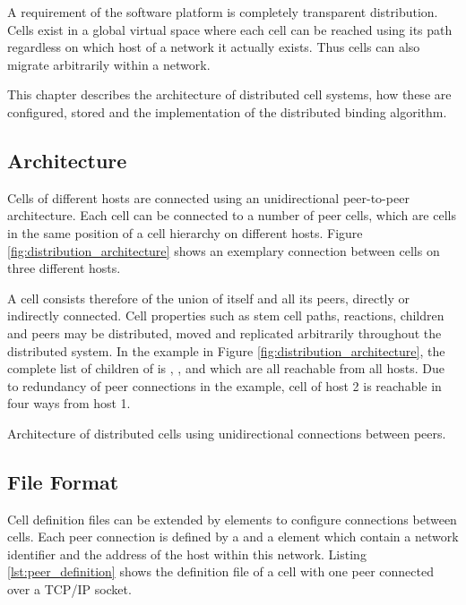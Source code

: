 A requirement of the software platform is completely transparent distribution. Cells exist in a global virtual space where each cell can be reached using its path regardless on which host of a network it actually exists. Thus cells can also migrate arbitrarily within a network.

This chapter describes the architecture of distributed cell systems, how these are configured, stored and the implementation of the distributed binding algorithm.

\subsection{Architecture}

Cells of different hosts are connected using an unidirectional peer-to-peer architecture. Each cell can be connected to a number of peer cells, which are cells in the same position of a cell hierarchy on different hosts. Figure \ref{fig:distribution_architecture} shows an exemplary connection between cells on three different hosts.

A cell consists therefore of the union of itself and all its peers, directly or indirectly connected. Cell properties such as stem cell paths, reactions, children and peers may be distributed, moved and replicated arbitrarily throughout the distributed system. In the example in Figure \ref{fig:distribution_architecture}, the complete list of children of  is , ,  and  which are all reachable from all hosts. Due to redundancy of peer connections in the example, cell  of host 2 is reachable in four ways from host 1.

{Architecture of distributed cells using unidirectional connections between peers.}

\subsection{File Format}

Cell definition files can be extended by  elements to configure connections between cells. Each peer connection is defined by a  and a  element which contain a network identifier and the address of the host within this network. Listing \ref{lst:peer_definition} shows the definition file of a cell with one peer connected over a TCP/IP socket.

